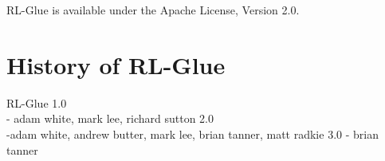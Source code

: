 \documentclass[twopage,11pt]{article}
\begin{document}
RL-Glue is available under the Apache License, Version 2.0.
	

\section{History of RL-Glue}
RL-Glue 1.0\\
- adam white, mark lee, richard sutton
2.0\\
-adam white, andrew butter, mark lee, brian tanner, matt radkie
3.0
- brian tanner
\\\\


%
%




\end{document}
